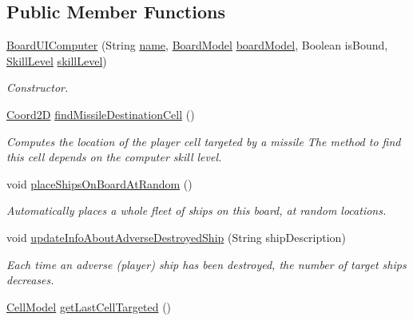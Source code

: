 \subsection*{Public Member Functions}
\begin{DoxyCompactItemize}
\item 
\hyperlink{classbattleship2D_1_1ui_1_1BoardUIComputer_a5ac5d7134ce3b7e68a3aee583e6c1f9c}{Board\-U\-I\-Computer} (String \hyperlink{classbattleship2D_1_1ui_1_1BoardUI_a7ad8f5d72803137c6ea6bde92a667c03}{name}, \hyperlink{classbattleship2D_1_1model_1_1BoardModel}{Board\-Model} \hyperlink{classbattleship2D_1_1ui_1_1BoardUI_a6c61b16484c780fb58e68bc8fb1494e6}{board\-Model}, Boolean is\-Bound, \hyperlink{enumbattleship2D_1_1model_1_1SkillLevel}{Skill\-Level} \hyperlink{classbattleship2D_1_1ui_1_1BoardUIComputer_a1c8d0fc4e6fd8ae9402dc45bee0fde2b}{skill\-Level})
\begin{DoxyCompactList}\small\item\em Constructor. \end{DoxyCompactList}\item 
\hyperlink{classbattleship2D_1_1model_1_1Coord2D}{Coord2\-D} \hyperlink{classbattleship2D_1_1ui_1_1BoardUIComputer_a01e137603a1dfeb17df93168a0235146}{find\-Missile\-Destination\-Cell} ()
\begin{DoxyCompactList}\small\item\em Computes the location of the player cell targeted by a missile The method to find this cell depends on the computer skill level. \end{DoxyCompactList}\item 
void \hyperlink{classbattleship2D_1_1ui_1_1BoardUIComputer_ac08e09696adf3c76c1cdfe5fb9010a36}{place\-Ships\-On\-Board\-At\-Random} ()
\begin{DoxyCompactList}\small\item\em Automatically places a whole fleet of ships on this board, at random locations. \end{DoxyCompactList}\item 
void \hyperlink{classbattleship2D_1_1ui_1_1BoardUIComputer_a564ca53a00bfee32ae6d7dafc01e2efb}{update\-Info\-About\-Adverse\-Destroyed\-Ship} (String ship\-Description)
\begin{DoxyCompactList}\small\item\em Each time an adverse (player) ship has been destroyed, the number of target ships decreases. \end{DoxyCompactList}\item 
\hyperlink{classbattleship2D_1_1model_1_1CellModel}{Cell\-Model} \hyperlink{classbattleship2D_1_1ui_1_1BoardUIComputer_a102d4a76a46a6a6f8f3f0e827930a9a5}{get\-Last\-Cell\-Targeted} ()
\end{DoxyCompactItemize}
